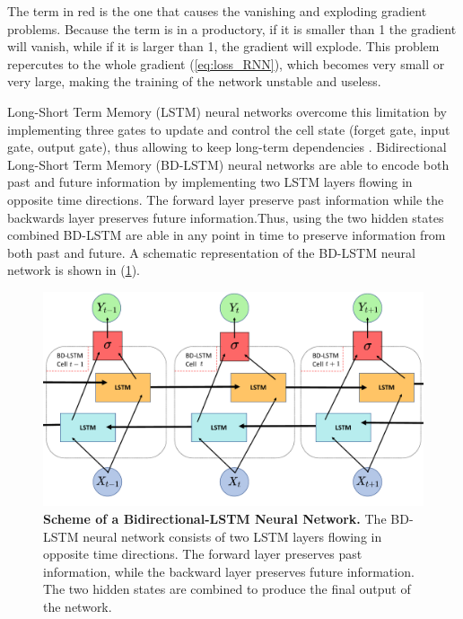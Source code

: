The term in red is the one that causes the vanishing and exploding gradient
problems. Because the term is in a productory, if it is smaller than 1 the
gradient will vanish, while if it is larger than 1, the gradient will explode.
This problem repercutes to the whole gradient (\cref{eq:loss_RNN}), which
becomes very small or very large, making the training of the network unstable
and useless.

Long-Short Term Memory (LSTM) neural networks overcome this limitation by
implementing three gates to update and control the cell state (forget gate,
input gate, output gate), thus allowing to keep long-term dependencies
\cite{LSTM_NN}. Bidirectional Long-Short Term Memory (BD-LSTM) neural networks
are able to encode both past and future information by implementing two LSTM
layers flowing in opposite time directions. The forward layer preserve past
information while the backwards layer preserves future information.Thus, using
the two hidden states combined BD-LSTM are able in any point in time to
preserve information from both past and future. A schematic representation of
the BD-LSTM neural network is shown in (\cref{fig:BD_LSTM_scheme}).

\begin{figure}[H]
  \centering
  \includegraphics[width=\textwidth]{Figures/BD_LSTM_scheme.pdf}
  \caption[Scheme of a Bidirectional-LSTM Neural Network]{\textbf{Scheme of a
      Bidirectional-LSTM Neural Network.} The BD-LSTM neural network consists
    of two LSTM layers flowing in opposite time directions. The forward layer
    preserves past information, while the backward layer preserves future
    information. The two hidden states are combined to produce the final output
    of the network.}
  \label{fig:BD_LSTM_scheme}
\end{figure}

